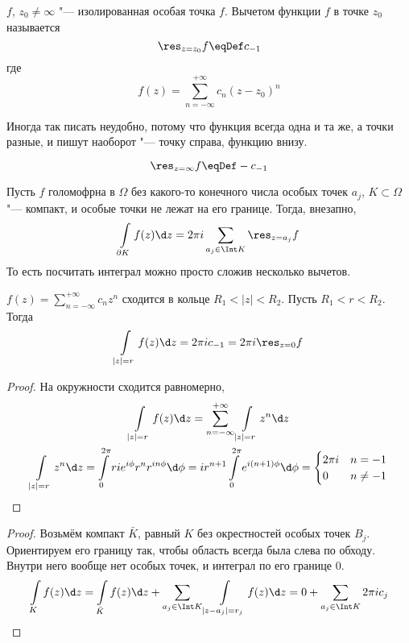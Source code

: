 \begin{Def}
	$f$, $z_0 \ne \infty$ "--- изолированная особая точка $f$.
	Вычетом функции $f$ в точке $z_0$ называется
	\[ \res_{z = z_0} f \eqDef c_{-1} \]
	где
	\[ f(z) = \sum_{n=-\infty}^{+\infty} c_n(z-z_0)^n \]
\end{Def}
Иногда так писать неудобно, потому что функция всегда одна и та же, а точки разные, и пишут наоборот "--- точку справа, функцию внизу.

\begin{Def}
	\[ \res_{z = \infty} f \eqDef -c_{-1}\]
\end{Def}

\begin{theorem}
	Пусть $f$ голомофрна в $\Omega$ без какого-то конечного числа особых точек $a_j$,
	$K \subset \Omega$ "--- компакт, и особые точки не лежат на его границе.
	Тогда, внезапно,
	\[ \int\limits_{\partial K} f(z) \d z = 2\pi i\sum_{a_j \in \Int K} \res_{z=a_j} f \]
	То есть посчитать интеграл можно просто сложив несколько вычетов.
\end{theorem}

\begin{lemma}
	$f(z) = \sum_{n=-\infty}^{+\infty} c_n z^n$ сходится в кольце $R_1 < |z| < R_2$.
	Пусть $R_1 < r < R_2$.
	Тогда
	\[ \int\limits_{|z| = r} f(z) \d z = 2\pi i c_{-1} = 2\pi i\res_{z=0} f \]
\end{lemma}
\begin{proof}
	На окружности сходится равномерно,
	\begin{gather*}
		\int\limits_{|z| = r} f(z)\d z
		= \sum_{n=-\infty}^{+\infty} \int\limits_{|z|=r} z^n \d z \\
		\int\limits_{|z| = r} z^n \d z
		= \int\limits_0^{2\pi} rie^{i\phi}r^nr^{in\phi} \d \phi
		= ir^{n+1} \int\limits_0^{2\pi} e^{i(n+1)\phi} \d \phi
		= \begin{cases} 2\pi i & n = -1 \\ 0 & n \ne -1 \end{cases}
	\end{gather*}
\end{proof}

\begin{proof}
	Возьмём компакт $\bar K$, равный $K$ без окрестностей особых точек $B_j$.
	Ориентируем его границу так, чтобы область всегда была слева по обходу.
	Внутри него вообще нет особых точек, и интеграл по его границе 0.
	\begin{gather*}
		\int\limits_K f(z) \d z
		= \int\limits_{\bar K} f(z) \d z + \sum_{a_j \in \Int K} \int\limits_{|z-a_j|=r_j} f(z) \d z
		= 0 + \sum_{a_j \in \Int K} 2\pi ic_j
	\end{gather*}
\end{proof}

